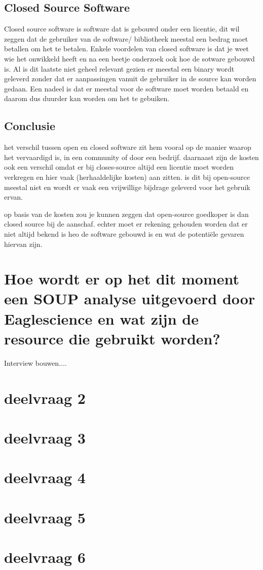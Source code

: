 \subsection{Closed Source Software}%
Closed source software is software dat is gebouwd onder een licentie, dit wil zeggen dat de gebruiker van de software/ bibliotheek meestal een bedrag moet betallen om het te betalen. Enkele voordelen van closed software is dat je weet wie het onwikkeld heeft en na een beetje onderzoek ook hoe de sotware gebouwd is. Al is dit laatste niet geheel relevant gezien er meestal een binary wordt geleverd zonder dat er aanpassingen vanuit de gebruiker in de source kan worden gedaan. Een nadeel is dat er meestal voor de software moet worden betaald en daarom dus duurder kan worden om het te gebuiken.

\subsection{Conclusie}

het verschil tussen open en closed software zit hem vooral op de manier waarop het vervaardigd is, in een community of door een bedrijf. daarnaast zijn de kosten ook een verschil omdat er bij closes-source altijd een licentie moet worden verkregen en hier vaak (herhaaldelijke kosten) aan zitten. is dit bij open-source meestal
niet en wordt er vaak een vrijwillige bijdrage geleverd voor het gebruik ervan.

op basis van de kosten zou je kunnen zeggen dat open-source goedkoper is dan closed source bij de aanschaf. echter moet er rekening gehouden worden dat er niet altijd bekend is heo de software gebouwd is en wat de potenti\"ele gevaren hiervan zijn.

\section{Hoe wordt er op het dit moment een SOUP analyse uitgevoerd door Eaglescience en wat zijn de resource die gebruikt worden?}

Interview bouwen....


\lipsum[10]


\section{deelvraag 2}

\lipsum[10]

\section{deelvraag 3}

\lipsum[10]

\section{deelvraag 4}

\lipsum[10]
\section{deelvraag 5}

\lipsum[10]


\section{deelvraag 6}
\lipsum[10]
